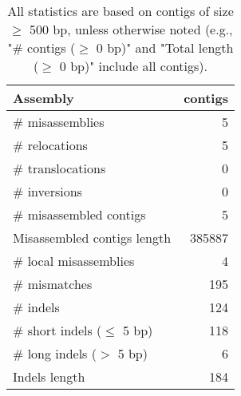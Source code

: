 \documentclass[12pt,a4paper]{article}
\begin{document}
\begin{table}[ht]
\begin{center}
\caption{All statistics are based on contigs of size $\geq$ 500 bp, unless otherwise noted (e.g., "\# contigs ($\geq$ 0 bp)" and "Total length ($\geq$ 0 bp)" include all contigs).}
\begin{tabular}{|l*{1}{|r}|}
\hline
Assembly & contigs \\ \hline
\# misassemblies & 5 \\ \hline
\hspace{5mm}\# relocations & 5 \\ \hline
\hspace{5mm}\# translocations & 0 \\ \hline
\hspace{5mm}\# inversions & 0 \\ \hline
\# misassembled contigs & 5 \\ \hline
Misassembled contigs length & 385887 \\ \hline
\# local misassemblies & 4 \\ \hline
\# mismatches & 195 \\ \hline
\# indels & 124 \\ \hline
\hspace{5mm}\# short indels ($\leq$ 5 bp) & 118 \\ \hline
\hspace{5mm}\# long indels ($>$ 5 bp) & 6 \\ \hline
Indels length & 184 \\ \hline
\end{tabular}
\end{center}
\end{table}
\end{document}
